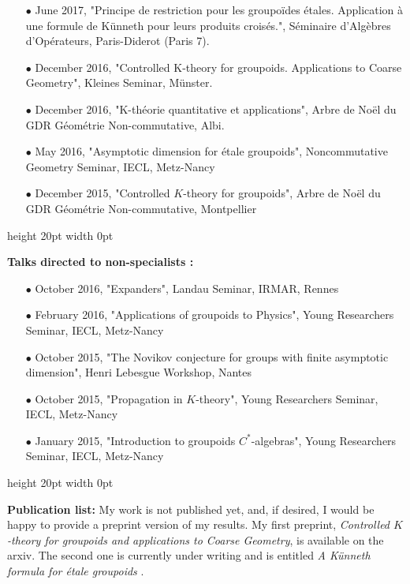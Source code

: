 \documentclass[a4paper,11pt]{article}
\newcommand\espace{\vrule height 20pt width 0pt}
\begin{document}
\begin{itemize}
\item[$\bullet$] June 2017, "Principe de restriction pour les groupoïdes étales. Application à une formule de Künneth pour leurs produits croisés.", Séminaire d'Algèbres d'Opérateurs, Paris-Diderot (Paris 7).
\item[$\bullet$] December 2016, "Controlled K-theory for groupoids. Applications to Coarse Geometry", Kleines Seminar, Münster.
\item[$\bullet$] December 2016, "K-théorie quantitative et applications", Arbre de Noël du GDR Géométrie Non-commutative, Albi.
\item[$\bullet$] May 2016, "Asymptotic dimension for étale groupoids", Noncommutative Geometry Seminar, IECL, Metz-Nancy
\item[$\bullet$] December 2015, "Controlled $K$-theory for groupoids", Arbre de Noël du GDR Géométrie Non-commutative, Montpellier
\end{itemize}
\espace

\textbf{Talks directed to non-specialists :}\\

\begin{itemize}
\item[$\bullet$] October 2016, "Expanders", Landau Seminar, IRMAR, Rennes %
\item[$\bullet$] February 2016, "Applications of groupoids to Physics", Young Researchers Seminar, IECL, Metz-Nancy
\item[$\bullet$] October 2015, "The Novikov conjecture for groups with finite asymptotic dimension", Henri Lebesgue Workshop, Nantes
\item[$\bullet$] October 2015, "Propagation in $K$-theory", Young Researchers Seminar, IECL, Metz-Nancy
\item[$\bullet$] January 2015, "Introduction to groupoids $C^*$-algebras", Young Researchers Seminar, IECL, Metz-Nancy
\end{itemize}
\espace

\textbf{Publication list:} My work is not published yet, and, if desired, I would be happy to provide a preprint version of my results. My first preprint, \textit{Controlled $K$-theory for groupoids and applications to Coarse Geometry}, is available on the arxiv. The second one is currently under writing and is entitled \textit{A K\"{u}nneth formula for \'etale groupoids	}.
\end{document}
